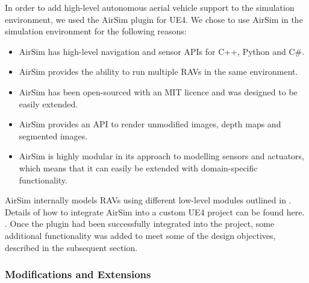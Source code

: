 In order to add high-level autonomous aerial vehicle support to the simulation environment, we used the AirSim \cite{ShahAirSim:Vehicles} plugin for UE4. We chose to use AirSim in the simulation environment for the following reasons: 
\begin{itemize}
\item AirSim has high-level navigation and sensor APIs for C++, Python and C\#.
\item AirSim provides the ability to run multiple RAVs in the same environment.
\item AirSim has been open-sourced with an MIT licence and was designed to be easily extended.
\item AirSim  provides an API to render unmodified images, depth maps and segmented images.
\item AirSim is highly modular in its approach to modelling sensors and actuators, which means that it can easily be extended with domain-specific functionality.
\end{itemize}
AirSim internally models RAVs using different low-level modules outlined in \cite{ShahAirSim:Vehicles}. Details of how to integrate AirSim into a custom UE4 project can be found here.  . Once the plugin had been successfully integrated into the project, some additional functionality was added to meet some of the design objectives, described in the subsequent section.

\subsubsection{Modifications and Extensions}
